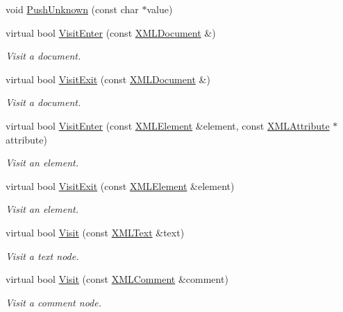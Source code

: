 \begin{DoxyCompactItemize}
void \hyperlink{classtinyxml2_1_1_x_m_l_printer_ab1efc6d1548505e9984185f58f54b713}{Push\-Unknown} (const char $\ast$value)
\item 
virtual bool \hyperlink{classtinyxml2_1_1_x_m_l_printer_a9aa1de11a55a07db55a90fde37d7afad}{Visit\-Enter} (const \hyperlink{classtinyxml2_1_1_x_m_l_document}{X\-M\-L\-Document} \&)
\begin{DoxyCompactList}\small\item\em Visit a document. \end{DoxyCompactList}\item 
virtual bool \hyperlink{classtinyxml2_1_1_x_m_l_printer_a15fc1f2b922f540917dcf52808737b29}{Visit\-Exit} (const \hyperlink{classtinyxml2_1_1_x_m_l_document}{X\-M\-L\-Document} \&)
\begin{DoxyCompactList}\small\item\em Visit a document. \end{DoxyCompactList}\item 
virtual bool \hyperlink{classtinyxml2_1_1_x_m_l_printer_a169b2509d8eabb70811b2bb8cfd1f5d1}{Visit\-Enter} (const \hyperlink{classtinyxml2_1_1_x_m_l_element}{X\-M\-L\-Element} \&element, const \hyperlink{classtinyxml2_1_1_x_m_l_attribute}{X\-M\-L\-Attribute} $\ast$attribute)
\begin{DoxyCompactList}\small\item\em Visit an element. \end{DoxyCompactList}\item 
virtual bool \hyperlink{classtinyxml2_1_1_x_m_l_printer_a2edd48405971a88951c71c9df86a2f50}{Visit\-Exit} (const \hyperlink{classtinyxml2_1_1_x_m_l_element}{X\-M\-L\-Element} \&element)
\begin{DoxyCompactList}\small\item\em Visit an element. \end{DoxyCompactList}\item 
virtual bool \hyperlink{classtinyxml2_1_1_x_m_l_printer_adc0e42b4f6fcb90a95630c79575d030b}{Visit} (const \hyperlink{classtinyxml2_1_1_x_m_l_text}{X\-M\-L\-Text} \&text)
\begin{DoxyCompactList}\small\item\em Visit a text node. \end{DoxyCompactList}\item 
virtual bool \hyperlink{classtinyxml2_1_1_x_m_l_printer_aa294c5c01af0ebb9114902456e4cb53c}{Visit} (const \hyperlink{classtinyxml2_1_1_x_m_l_comment}{X\-M\-L\-Comment} \&comment)
\begin{DoxyCompactList}\small\item\em Visit a comment node. \end{DoxyCompactList}\item 

\end{DoxyCompactItemize}
